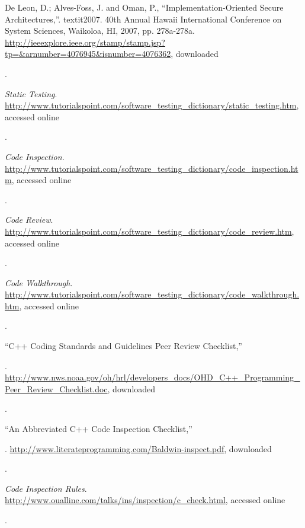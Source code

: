 \documentclass[12pt]{extarticle}
\begin{document}
\begin{thebibliography}{9}
	De Leon, D.;  Alves-Foss, J. and Oman, P.,
	``Implementation-Oriented Secure Architectures,''. 
	textit{2007. 40th Annual Hawaii International Conference on System Sciences}, Waikoloa, HI, 2007, pp. 278a-278a.
	\url{http://ieeexplore.ieee.org/stamp/stamp.jsp?tp=&arnumber=4076945&isnumber=4076362}, downloaded
	\date{17 April 2016}.

	\textit{Static Testing}.
	\url{http://www.tutorialspoint.com/software_testing_dictionary/static_testing.htm}, accessed online
	\date{17 April 2016}.
	
	\textit{Code Inspection}.
	\url{http://www.tutorialspoint.com/software_testing_dictionary/code_inspection.htm}, accessed online
	\date{17 April 2016}.
		
	\textit{Code Review}.
	\url{http://www.tutorialspoint.com/software_testing_dictionary/code_review.htm}, accessed online
	\date{17 April 2016}.
		
	\textit{Code Walkthrough}.
	\url{http://www.tutorialspoint.com/software_testing_dictionary/code_walkthrough.htm}, accessed online
	\date{17 April 2016}.

	``C++ Coding Standards and Guidelines Peer Review Checklist,''
	\date{16 November 2006}.
	\url{http://www.nws.noaa.gov/oh/hrl/developers_docs/OHD_C++_Programming_Peer_Review_Checklist.doc}, downloaded
	\date{17 April 2016}.

	``An Abbreviated C++ Code Inspection Checklist,''
	\date{27 October 1992}.
	\url{http://www.literateprogramming.com/Baldwin-inspect.pdf}, downloaded
	\date{17 April 2016}.
		
	\textit{Code Inspection Rules}.
	\url{http://www.oualline.com/talks/ins/inspection/c_check.html}, accessed online
	\date{17 April 2016}.

\end{thebibliography}
\end{document}
